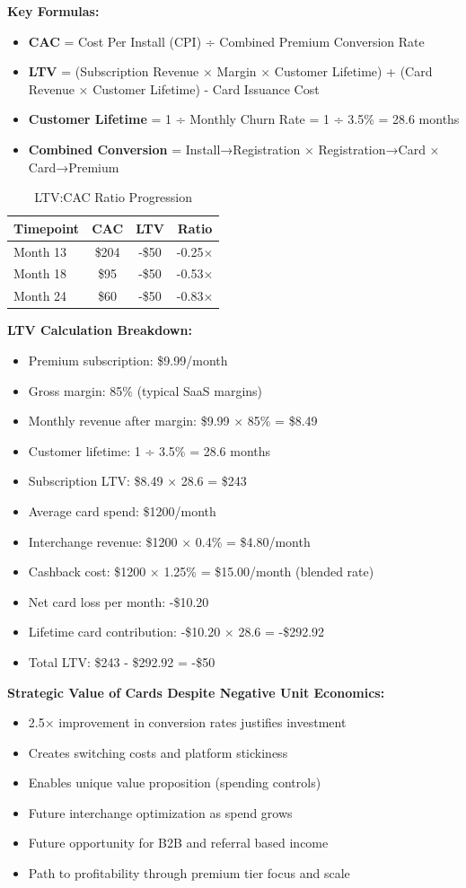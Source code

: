 \documentclass[11pt,letterpaper]{article}
\begin{document}
\textbf{Key Formulas:}
\begin{itemize}
\item \textbf{CAC} = Cost Per Install (CPI) ÷ Combined Premium Conversion Rate
\item \textbf{LTV} = (Subscription Revenue × Margin × Customer Lifetime) + (Card Revenue × Customer Lifetime) - Card Issuance Cost
\item \textbf{Customer Lifetime} = 1 ÷ Monthly Churn Rate = 1 ÷ 3.5\% = 28.6 months
\item \textbf{Combined Conversion} = Install→Registration × Registration→Card × Card→Premium
\end{itemize}

\begin{table}[h]
\centering
\caption{LTV:CAC Ratio Progression}
\begin{tabular}{|l|c|c|c|}
\hline
\textbf{Timepoint} & \textbf{CAC} & \textbf{LTV} & \textbf{Ratio} \\
\hline
Month 13 & \$204 & -\$50 & -0.25× \\
Month 18 & \$95 & -\$50 & -0.53× \\
Month 24 & \$60 & -\$50 & -0.83× \\
\hline
\end{tabular}
\end{table}

\textbf{LTV Calculation Breakdown:} 
\begin{itemize}
\item Premium subscription: \$9.99/month
\item Gross margin: 85\% (typical SaaS margins)
\item Monthly revenue after margin: \$9.99 × 85\% = \$8.49
\item Customer lifetime: 1 ÷ 3.5\% = 28.6 months
\item Subscription LTV: \$8.49 × 28.6 = \$243
\item Average card spend: \$1200/month
\item Interchange revenue: \$1200 × 0.4\% = \$4.80/month
\item Cashback cost: \$1200 × 1.25\% = \$15.00/month (blended rate)
\item Net card loss per month: -\$10.20
\item Lifetime card contribution: -\$10.20 × 28.6 = -\$292.92
\item Total LTV: \$243 - \$292.92 = -\$50
\end{itemize}

\textbf{Strategic Value of Cards Despite Negative Unit Economics:}
\begin{itemize}
\item 2.5× improvement in conversion rates justifies investment
\item Creates switching costs and platform stickiness
\item Enables unique value proposition (spending controls)
\item Future interchange optimization as spend grows
\item Future opportunity for B2B and referral based income
\item Path to profitability through premium tier focus and scale
\end{itemize}
\end{document}
